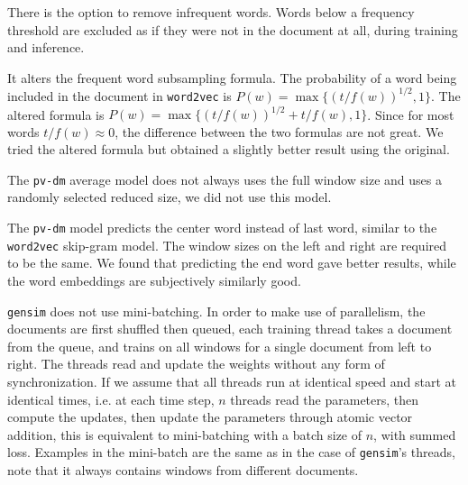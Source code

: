 \documentclass{article}
\begin{document}
\begin{appendices}
There is the option to remove infrequent words. Words below a frequency threshold are excluded as if they were not in the document at all, during training and inference.

It alters the frequent word subsampling formula. The probability of a word being included in the document in \texttt{word2vec} is $P(w)=\max\{(t/f(w))^{1/2}, 1\}$. The altered formula is $P(w)=\max\{(t/f(w))^{1/2} + {t/f(w)}, 1\}$. Since for most words $t/f(w)\approx 0$, the difference between the two formulas are not great. We tried the altered formula but obtained a slightly better result using the original.

The \texttt{pv-dm} average model does not always uses the full window size and uses a randomly selected reduced size, we did not use this model.

The \texttt{pv-dm} model predicts the center word instead of last word, similar to the \texttt{word2vec} skip-gram model. The window sizes on the left and right are required to be the same. We found that predicting the end word gave better results, while the word embeddings are subjectively similarly good.

\texttt{gensim} does not use mini-batching. In order to make use of parallelism, the documents are first shuffled then queued, each training thread takes a document from the queue, and trains on all windows for a single document from left to right. The threads read and update the weights without any form of synchronization. If we assume that all threads run at identical speed and start at identical times, i.e. at each time step, $n$ threads read the parameters, then compute the updates, then update the parameters through atomic vector addition, this is equivalent to mini-batching with a batch size of $n$, with summed loss. Examples in the mini-batch are the same as in the case of \texttt{gensim}'s threads, note that it always contains windows from different documents.

\end{appendices}

{}

\end{document}
